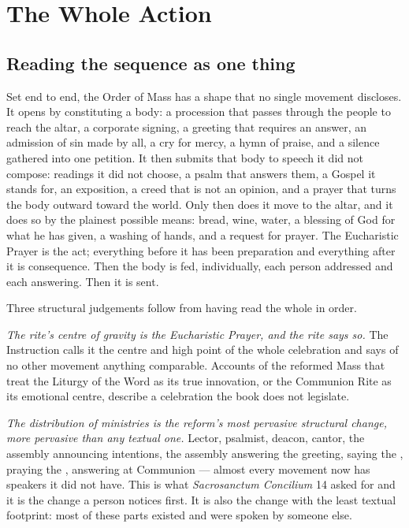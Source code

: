 \section{The Whole Action}

\subsection{Reading the sequence as one thing}

Set end to end, the Order of Mass has a shape that no single movement discloses. It opens by
constituting a body: a procession that passes through the people to reach the altar, a corporate
signing, a greeting that requires an answer, an admission of sin made by all, a cry for mercy, a
hymn of praise, and a silence gathered into one petition. It then submits that body to speech it
did not compose: readings it did not choose, a psalm that answers them, a Gospel it stands for,
an exposition, a creed that is not an opinion, and a prayer that turns the body outward toward
the world. Only then does it move to the altar, and it does so by the plainest possible means:
bread, wine, water, a blessing of God for what he has given, a washing of hands, and a request
for prayer. The Eucharistic Prayer is the act; everything before it has been preparation and
everything after it is consequence. Then the body is fed, individually, each person addressed
and each answering. Then it is sent.

Three structural judgements follow from having read the whole in order.

\emph{The rite's centre of gravity is the Eucharistic Prayer, and the rite says so.} The
Instruction calls it the centre and high point of the whole celebration and says of no other
movement anything comparable. Accounts of the reformed Mass that treat the Liturgy of the Word
as its true innovation, or the Communion Rite as its emotional centre, describe a celebration
the book does not legislate.

\emph{The distribution of ministries is the reform's most pervasive structural change, more
pervasive than any textual one.} Lector, psalmist, deacon, cantor, the assembly announcing
intentions, the assembly answering the greeting, saying the , praying the
, answering  at Communion --- almost every movement now has
speakers it did not have. This is what \emph{Sacrosanctum Concilium} 14 asked for and it is the
change a person notices first. It is also the change with the least textual footprint: most of
these parts existed and were spoken by someone else.

